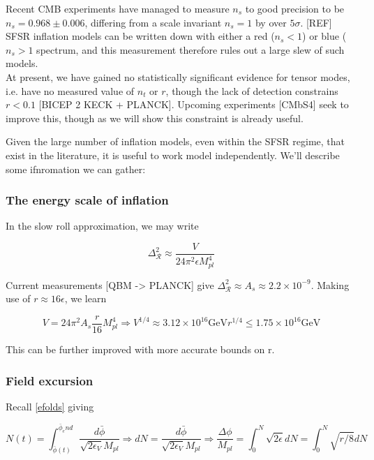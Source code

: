 \documentclass[a4paper,11pt]{article}
\newcommand{\Mp}{M_{pl}}
\newcommand{\bphi}{\bar{\phi}}
\begin{document}
Recent CMB experiments have managed to measure $n_s$ to good precision to be $n_s=0.968\pm0.006$, differing from a scale invariant $n_s=1$ by over $5\sigma$. [REF] SFSR inflation models can be written down with either a red ($n_s<1$) or blue ($n_s>1$ spectrum, and this measurement therefore rules out a large slew of such models. \\

At present, we have gained no statistically significant evidence for tensor modes, i.e. have no measured value of $n_t$ or $r$, though the lack of detection constrains $r<0.1$ [BICEP 2 KECK + PLANCK]. Upcoming experiments [CMbS4] seek to improve this, though as we will show this constraint is already useful. 

Given the large number of inflation models, even within the SFSR regime, that exist in the literature, it is useful to work model independently. We'll describe some ifnromation we can gather:

\subsubsection{The energy scale of inflation}

In the slow roll approximation, we may write 

\begin{equation}
\Delta^2_{\mathcal{R}}\approx \frac{V}{24\pi^2\epsilon\Mp^4}
\end{equation}

Current measurements [QBM -> PLANCK] give $\Delta^2_{\mathcal{R}} \approx A_s \approx 2.2\times10^{-9}$. Making use of $r\approx 16\epsilon$, we learn

\begin{equation}
V=24\pi^2A_s\frac{r}{16}\Mp^4 \Rightarrow V^{1/4} \approx 3.12\times10^{16}\text{GeV}r^{1/4} \leq 1.75\times10^{16}\text{GeV}
\end{equation}

This can be further improved with more accurate bounds on r.

\subsubsection{Field excursion}
Recall \ref{efolds} giving 

\begin{equation}
N(t) =  \int_{\bphi(t)}^{\bphi_end} \frac{d\bphi}{\sqrt{2\epsilon_V}\Mp}
\Rightarrow dN=\frac{d\bphi}{\sqrt{2\epsilon_V}\Mp}
\Rightarrow \frac{\Delta \phi}{\Mp} = \int_0^N \sqrt{2\epsilon} dN = \int_0^N \sqrt{r/8} dN 
\end{equation}
\end{document}
